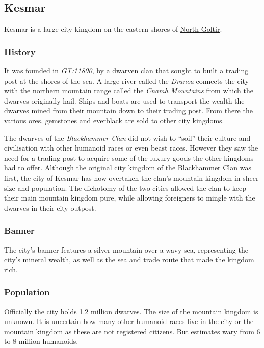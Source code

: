 \subsection{Kesmar}
\label{sec:Kesmar}

Kesmar is a large city kingdom on the eastern shores of
\hyperref[sec:Goltir]{North Goltir}.

\subsubsection*{History}

It was founded in \emph{GT:11800}, by a dwarven clan that sought to built a
trading post at the shores of the sea. A large river called the \emph{Dranoa}
connects the city with the northern mountain range called the
\emph{Cnamh Mountains} from which the dwarves originally hail. Ships and
boats are used to transport the wealth the dwarves mined from their mountain
down to their trading post. From there the various ores, gemstones and everblack
are sold to other city kingdoms.

The dwarves of the \emph{Blackhammer Clan} did not wish to ``soil'' their
culture and civilisation with other humanoid races or even beast
races. However they saw the need for a trading post to acquire some of the
luxury goods the other kingdoms had to offer. Although the original city
kingdom of the Blackhammer Clan was first, the city of Kesmar has now
overtaken the clan's mountain kingdom in sheer size and population. The
dichotomy of the two cities allowed the clan to keep their main mountain
kingdom pure, while allowing foreigners to mingle with the dwarves in their
city outpost.

\subsubsection*{Banner}

The city's banner features a silver mountain over a wavy sea, representing the
city's mineral wealth, as well as the sea and trade route that made the
kingdom rich.

\subsubsection*{Population}

Officially the city holds 1.2 million dwarves. The size of the mountain
kingdom is unknown. It is uncertain how many other humanoid races live in
the city or the mountain kingdom as these are not registered citizens. But
estimates wary from 6 to 8 million humanoids.

